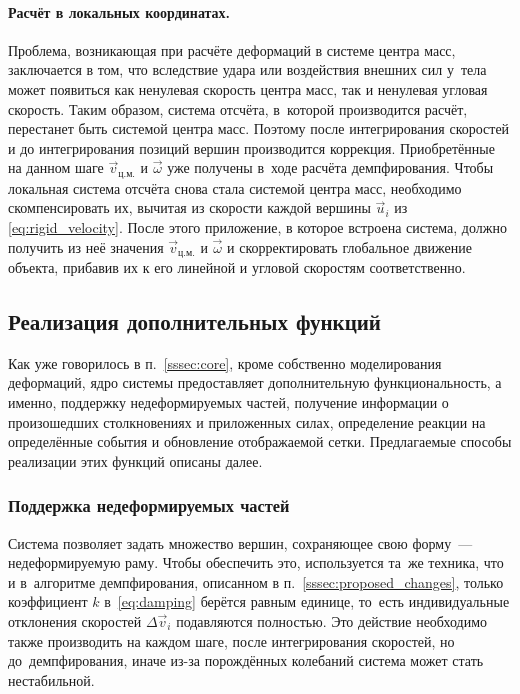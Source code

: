 \documentclass[a4paper, 14pt, titlepage]{extarticle}
\newcommand{\vect}[1]{\vec{#1}} %
\begin{document}
        \paragraph{Расчёт в локальных координатах.} Проблема, возникающая при расчёте деформаций в
        системе центра масс, заключается в том, что вследствие удара или воздействия внешних сил
        у~тела может появиться как ненулевая скорость центра масс, так и ненулевая угловая скорость.
        Таким образом, система отсчёта, в~которой производится расчёт, перестанет быть системой центра
        масс. Поэтому после интегрирования скоростей и до интегрирования позиций вершин производится
        коррекция. Приобретённые на данном шаге $\vect{v}_{ц.м.}$ и $\vect{\omega}$ уже получены
        в~ходе расчёта демпфирования. Чтобы локальная система отсчёта снова стала системой центра масс,
        необходимо скомпенсировать их, вычитая из скорости каждой вершины $\vect{u}_i$ из \eqref{eq:rigid_velocity}.
        После этого приложение, в которое встроена система, должно получить из неё значения
        $\vect{v}_{ц.м.}$ и $\vect{\omega}$ и скорректировать глобальное движение объекта, прибавив их
        к его линейной и угловой скоростям соответственно.

    \subsection{Реализация дополнительных функций}

      Как уже говорилось в п.~\ref{sssec:core}, кроме собственно моделирования деформаций, ядро
      системы предоставляет дополнительную функциональность, а именно, поддержку недеформируемых
      частей, получение информации о произошедших столкновениях и приложенных силах, определение
      реакции на определённые события и обновление отображаемой сетки. Предлагаемые способы
      реализации этих функций описаны далее.

      \subsubsection{Поддержка недеформируемых частей}

        Система позволяет задать множество вершин, сохраняющее свою форму~--- недеформируемую раму.
        Чтобы обеспечить это, используется та~же техника, что и в~алгоритме демпфирования,
        описанном в п.~\ref{sssec:proposed_changes}, только коэффициент $k$ в~\eqref{eq:damping}
        берётся равным единице, то~есть индивидуальные отклонения скоростей $\Delta \vect{v}_i$
        подавляются полностью. Это действие необходимо также производить на каждом шаге, после
        интегрирования скоростей, но до~демпфирования, иначе из-за порождённых колебаний система
        может стать нестабильной.
\end{document}
